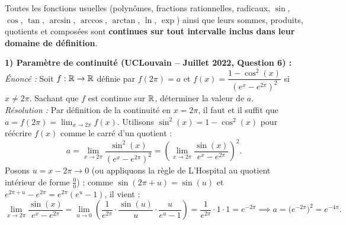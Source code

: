 Toutes les fonctions usuelles (polynômes, fractions rationnelles, radicaux, $\sin$, $\cos$, $\tan$, $\arcsin$, $\arccos$, $\arctan$, $\ln$, $\exp$) ainsi que leurs sommes, produits, quotients et composées sont \textbf{continues sur tout intervalle inclus dans leur domaine de définition}.

\begin{exemple}
\textbf{1) Paramètre de continuité (UCLouvain -- Juillet 2022, Question 6) :}\\
\emph{Énoncé :} Soit $f : \mathbb{R} \to \mathbb{R}$ définie par $f(2\pi) = a$ et $f(x) = \dfrac{1 - \cos^2(x)}{(e^x - e^{2\pi})^2}$ si $x \neq 2\pi$. Sachant que $f$ est continue sur $\mathbb{R}$, déterminer la valeur de $a$.\\
\emph{Résolution :} Par définition de la continuité en $x = 2\pi$, il faut et il suffit que $a = f(2\pi) = \lim_{x \to 2\pi} f(x)$. Utilisons $\sin^2(x) = 1 - \cos^2(x)$ pour réécrire $f(x)$ comme le carré d'un quotient :
\[
    a = \lim_{x \to 2\pi} \frac{\sin^2(x)}{(e^x - e^{2\pi})^2} = \left(\lim_{x \to 2\pi} \frac{\sin(x)}{e^x - e^{2\pi}}\right)^2.
\]
Posons $u = x - 2\pi \to 0$ (ou appliquons la règle de L'Hospital au quotient intérieur de forme $\frac{0}{0}$) : comme $\sin(2\pi + u) = \sin(u)$ et $e^{2\pi+u} - e^{2\pi} = e^{2\pi}(e^u - 1)$, il vient :
\[
    \lim_{x \to 2\pi} \frac{\sin(x)}{e^x - e^{2\pi}} = \lim_{u \to 0} \left(\frac{1}{e^{2\pi}} \cdot \frac{\sin(u)}{u} \cdot \frac{u}{e^u - 1}\right) = \frac{1}{e^{2\pi}} \cdot 1 \cdot 1 = e^{-2\pi} \implies \boxed{a = \bigl(e^{-2\pi}\bigr)^2 = e^{-4\pi}}.
\]


\end{exemple}
